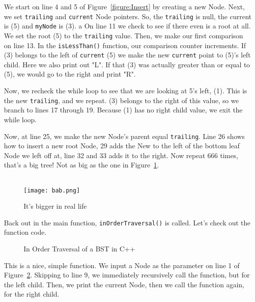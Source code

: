 \documentclass[letterpaper, 10pt,DIV=13]{scrartcl}
\numberwithin{equation}{section} %
\numberwithin{figure}{section} %
\numberwithin{table}{section} %
\begin{document}
We start on line 4 and 5 of Figure~\ref{figure:Insert} by creating a new Node. Next, we set \texttt{trailing} and \texttt{current} Node pointers. So, the \texttt{trailing} is null, the current is (5) and \texttt{myNode} is (3). a On line 11 we check to see if there even is a root at all. We set the root (5) to the \texttt{trailing} value. Then, we make our first comparison on line 13. In the \texttt{isLessThan()} function, our comparison counter increments. If (3) belongs to the left of \texttt{current} (5) we make the new \texttt{current} point to (5)'s left child. Here we also print out "L". If that (3) was actually greater than or equal to (5), we would go to the right and print "R". 

Now, we recheck the while loop to see that we are looking at 5's left, (1). This is the new \texttt{trailing}, and we repeat. (3) belongs to the right of this value, so we branch to lines 17 through 19. Because (1) has no right child value, we exit the while loop.

Now, at line 25, we make the new Node's parent equal \texttt{trailing}. Line 26 shows how to insert a new root Node, 29 adds the New to the left of the bottom leaf Node we left off at, line 32 and 33 adds it to the right. Now repeat 666 times, that's a big tree! Not as big as the one in Figure~\ref{figure:Tree}.
\\\\

\begin{figure}[h] 
    \centering 
    \texttt{[image: bab.png]}
    \caption{It's bigger in real life\footnotemark}
    \label{figure:Tree}
    
\end{figure}

\pagebreak

Back out in the main function, \texttt{inOrderTraversal()} is called. Let's check out the function code.

\begin{figure}[h] 
    \centering 
    
    \caption{In Order Traversal of a BST in C++}
    \label{figure:InOrder}
\end{figure}

This is a nice, simple function. We input a Node as the parameter on line 1 of Figure~\ref{figure:InOrder}. Skipping to line 9, we immediately recursively call the function, but for the left child. Then, we print the current Node, then we call the function again, for the right child.
\end{document}
